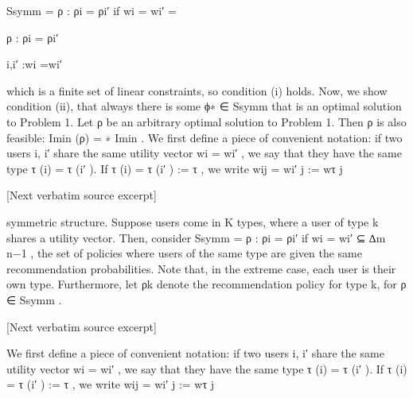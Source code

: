 \documentclass[10pt]{article}
\begin{document}
\begin{ReviewVerbatim}
Ssymm = {ρ : ρi = ρi′ if wi = wi′ } =

{ρ : ρi = ρi′ }

i,i′ :wi =wi′

which is a finite set of linear constraints, so condition (i) holds.
Now, we show condition (ii), that always there is some ϕ∗ ∈ Ssymm that is an optimal solution to
Problem 1. Let ρ be an arbitrary optimal solution to Problem 1. Then ρ is also feasible: Imin (ρ) =
∗
Imin
.
We first define a piece of convenient notation: if two users i, i′ share the same utility vector wi = wi′ ,
we say that they have the same type τ (i) = τ (i′ ). If τ (i) = τ (i′ ) := τ , we write wij = wi′ j := wτ j

[Next verbatim source excerpt]

symmetric structure. Suppose users come in K types, where a user of type k shares a utility vector.
Then, consider Ssymm = {ρ : ρi = ρi′ if wi = wi′ } ⊆ ∆m
n−1 , the set of policies where users of the
same type are given the same recommendation probabilities. Note that, in the extreme case, each user
is their own type. Furthermore, let ρk denote the recommendation policy for type k, for ρ ∈ Ssymm .

[Next verbatim source excerpt]

We first define a piece of convenient notation: if two users i, i′ share the same utility vector wi = wi′ ,
we say that they have the same type τ (i) = τ (i′ ). If τ (i) = τ (i′ ) := τ , we write wij = wi′ j := wτ j
\end{ReviewVerbatim}
\end{document}
